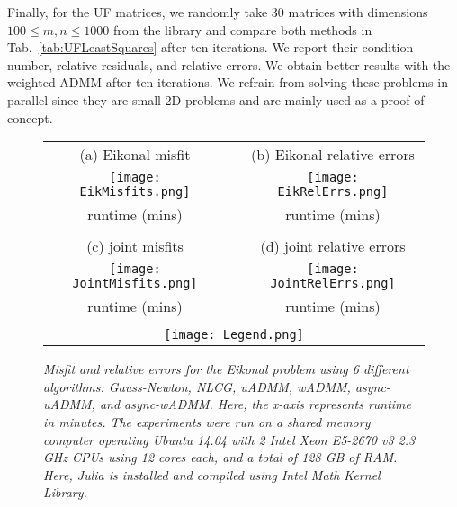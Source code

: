 \documentclass[11pt]{article}          %
\begin{document}
Finally, for the UF matrices, we randomly take $30$ matrices with dimensions $100 \leq m,n \leq 1000$ from the library and compare both methods in Tab.~\ref{tab:UFLeastSquares} after ten iterations. We report their condition number, relative residuals, and relative errors. We obtain better results with the weighted ADMM after ten iterations. 
We refrain from solving these problems in parallel since they are small 2D problems and are mainly used as a proof-of-concept.

\begin{figure}[t]
  \begin{tabular}{ccc}
    (a) Eikonal misfit & & (b) Eikonal relative errors
    \\
    \texttt{[image: EikMisfits.png]}
    &
    &
    \texttt{[image: EikRelErrs.png]}
    \\
    runtime (mins)
    &
    &
    runtime (mins)
    \\
    \\
    (c) joint misfits & & (d) joint relative errors
    \\
    \texttt{[image: JointMisfits.png]}
    &
    &
    \texttt{[image: JointRelErrs.png]}
    \\
    runtime (mins)
    &
    &
    runtime (mins)
    \\
    \\
    \multicolumn{3}{c}{\texttt{[image: Legend.png]}}
  \end{tabular}
  \caption{\textit{Misfit and relative errors for the Eikonal problem using 6 different algorithms: Gauss-Newton, NLCG, uADMM, wADMM, async-uADMM, and async-wADMM. Here, the x-axis represents runtime in minutes. The experiments were run on a shared memory computer operating Ubuntu 14.04 with 2 Intel Xeon E5-2670 v3 2.3 GHz CPUs using 12 cores each, and a total of 128 GB of RAM. Here, Julia is installed and compiled using Intel Math Kernel Library.}}
  \label{fig:MisfitsRelErrs}
  \vspace{-7mm}
\end{figure}
\end{document}
